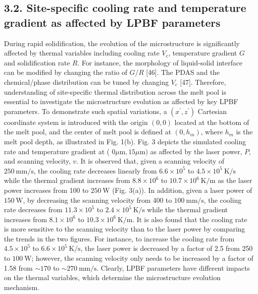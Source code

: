 \documentclass[10pt]{article}
\begin{document}
\subsection*{3.2. Site-specific cooling rate and temperature gradient as affected by LPBF parameters}
During rapid solidification, the evolution of the microstructure is significantly affected by thermal variables including cooling rate $V_{c}$, temperature gradient $G$ and solidification rate $R$. For instance, the morphology of liquid-solid interface can be modified by changing the ratio of $G / R$ [46]. The PDAS and the chemical/phase distribution can be tuned by changing $V_{c}$ [47]. Therefore, understanding of site-specific thermal distribution across the melt pool is essential to investigate the microstructure evolution as affected by key LPBF parameters. To demonstrate such spatial variations, a $\left(x^{\prime}, z^{\prime}\right)$ Cartesian coordinate system is introduced with the origin $(0,0)$ located at the bottom of the melt pool, and the center of melt pool is defined at $\left(0, h_{m}\right)$, where $h_{m}$ is the melt pool depth, as illustrated in Fig. 1(b). Fig. 3 depicts the simulated cooling rate and temperature gradient at ( $0 \mu \mathrm{m}, 15 \mu \mathrm{m})$ as affected by the laser power, $P$, and scanning velocity, $v$. It is observed that, given a scanning velocity of $250 \mathrm{~mm} / \mathrm{s}$, the cooling rate decreases linearly from $6.6 \times 10^{5}$ to $4.5 \times 10^{5} \mathrm{~K} / \mathrm{s}$ while the thermal gradient increases from $8.8 \times 10^{6}$ to $10.7 \times 10^{6} \mathrm{~K} / \mathrm{m}$ as the laser power increases from 100 to $250 \mathrm{~W}$ (Fig. 3(a)). In addition, given a laser power of $150 \mathrm{~W}$, by decreasing the scanning velocity from 400 to $100 \mathrm{~mm} / \mathrm{s}$, the cooling rate decreases from $11.3 \times 10^{5}$ to $2.4 \times 10^{5} \mathrm{~K} / \mathrm{s}$ while the thermal gradient increases from $8.1 \times 10^{6}$ to $10.3 \times 10^{6} \mathrm{~K} / \mathrm{m}$. It is also found that the cooling rate is more sensitive to the scanning velocity than to the laser power by comparing the trends in the two figures. For instance, to increase the cooling rate from $4.5 \times 10^{5}$ to $6.6 \times 10^{5} \mathrm{~K} / \mathrm{s}$, the laser power is decreased by a factor of 2.5 from 250 to $100 \mathrm{~W}$; however, the scanning velocity only needs to be increased by a factor of 1.58 from $\sim 170$ to $\sim 270 \mathrm{~mm} / \mathrm{s}$. Clearly, LPBF parameters have different impacts on the thermal variables, which determine the microstructure evolution mechanism.
\end{document}
